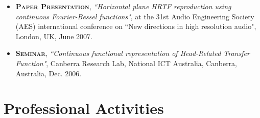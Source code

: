 \documentclass[10pt]{article}
\begin{document}
\begin{itemize}
\item \textsc{\textbf{Paper Presentation}},
\emph{``Horizontal plane HRTF reproduction using continuous Fourier-Bessel functions"}, at the 31st Audio
Engineering Society (AES) international conference on ``New directions in high resolution audio", London, UK,
June 2007.

\item \textsc{\textbf{Seminar}},
\emph{``Continuous functional representation of Head-Related Transfer Function"}, Canberra Research Lab,
National ICT Australia, Canberra, Australia, Dec. 2006.

\end{itemize}

\section*{Professional Activities}
%
\end{document}
